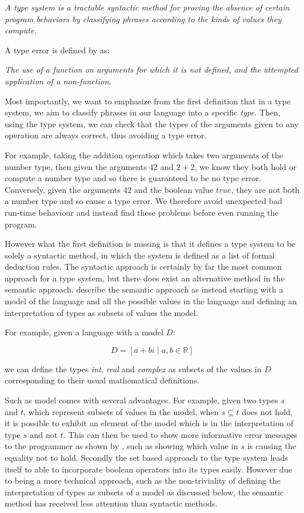 \documentclass{l4proj}
\begin{document}
\emph{A type system is a tractable syntactic method for proving the absence of certain program behaviors by classifying phrases according to the kinds of values they compute.}

A type error is defined by \citet{wright1994} as:

\emph{The use of a function on arguments for which it is not defined, and the attempted application of a non-function.}

Most importantly, we want to emphasize from the first definition that in a type system, we aim to classify phrases in our language into a specific \emph{type}.
Then, using the type system, we can check that the types of the arguments given to any operation are always correct, thus avoiding a type error.

For example, taking the addition operation which takes two arguments of the number type, then given the arguments $42$ and $2 + 2$, we know they both hold or compute a number type and so there is guaranteed to be no type error.
Conversely, given the arguments $42$ and the boolean value $true$, they are not both a number type and so cause a type error.
We therefore avoid unexpected bad run-time behaviour and instead find these problems before even running the program.

However what the first definition is missing is that it defines a type system to be solely a syntactic method, in which the system is defined as a list of formal deduction rules.
The syntactic approach is certainly by far the most common approach for a type system, but there does exist an alternative method in the semantic approach.
\citet{Frisch2002} describe the semantic approach as instead starting with a model of the language and all the possible values in the language and defining an interpretation of types as subsets of values the model.

For example, given a language with a model $D$:

\begin{equation*}
    D = \left[ a + bi \mid a, b \in \mathbb{R}\right]
\end{equation*}

we can define the types \emph{int}, \emph{real} and \emph{complex} as subsets of the values in $D$ corresponding to their usual mathematical definitions.

Such as model comes with several advantages.
For example, given two types $s$ and $t$, which represent subsets of values in the model, when $s \subseteq t$ does not hold, it is possible to exhibit an element of the model which is in the interpretation of type $s$ and not $t$.
This can then be used to show more informative error messages to the programmer as shown by \citet{Castagna2005}, such as showing which value in $s$ is causing the equality not to hold.
Secondly the set based approach to the type system leads itself to able to incorporate boolean operators into its types easily.
However due to being a more technical approach, such as the non-triviality of defining the interpretation of types as subsets of a model as discussed below, the semantic method has received less attention than syntactic methods.
\end{document}
